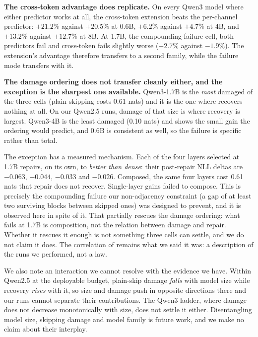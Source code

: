 \textbf{The cross-token advantage does replicate.} On every Qwen3 model where either predictor
works at all, the cross-token extension beats the per-channel predictor: $+21.2\%$ against
$+20.5\%$ at 0.6B, $+6.2\%$ against $+4.7\%$ at 4B, and $+13.2\%$ against $+12.7\%$ at 8B. At
1.7B, the compounding-failure cell, both predictors fail and cross-token fails slightly worse
($-2.7\%$ against $-1.9\%$). The extension's advantage therefore transfers to a second family,
while the failure mode transfers with it.

\textbf{The damage ordering does not transfer cleanly either, and the exception is the sharpest
one available.} Qwen3-1.7B is the \emph{most} damaged of the three cells (plain skipping costs
0.61 nats) and it is the one where \mname recovers nothing at all. On our Qwen2.5 runs, damage
of that size is where recovery is largest. Qwen3-4B is the least damaged (0.10 nats) and shows
the small gain the ordering would predict, and 0.6B is consistent as well, so the failure is
specific rather than total.

The exception has a measured mechanism. Each of the four layers selected at 1.7B repairs, on
its own, to \emph{better than dense}: their post-repair NLL deltas are $-0.063$, $-0.044$,
$-0.033$ and $-0.026$. Composed, the same four layers cost 0.61 nats that repair does not
recover. Single-layer gains failed to compose. This is precisely the compounding failure our
non-adjacency constraint (a gap of at least two surviving blocks between skipped ones) was
designed to prevent, and it is observed here in spite of it. That partially rescues the damage
ordering: what fails at 1.7B is composition, not the relation between damage and repair.
Whether it rescues it enough is not something three cells can settle, and we do not claim it
does. The correlation of  remains what we said it was: a description of the
runs we performed, not a law.

We also note an interaction we cannot resolve with the evidence we have. Within Qwen2.5 at the
deployable budget, plain-skip damage \emph{falls} with model size while recovery \emph{rises}
with it, so size and damage push in opposite directions there and our runs cannot separate their
contributions. The Qwen3 ladder, where damage does not decrease monotonically with size, does
not settle it either. Disentangling model size, skipping damage and model family is future work,
and we make no claim about their interplay.

